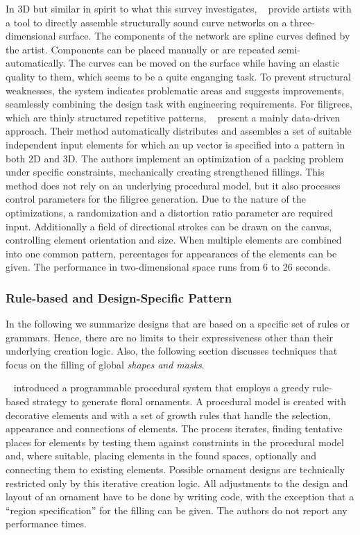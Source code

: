 In 3D but similar in spirit to what this survey investigates, \citeauthor*{zehnder_2016_dso}~\cite{zehnder_2016_dso} provide artists with a tool to directly assemble structurally sound curve networks on a three-dimensional surface. The components of the network are spline curves defined by the artist. Components can be placed manually or are repeated semi-automatically. The curves can be moved on the surface while having an elastic quality to them, which seems to be a quite enganging task. To prevent structural weaknesses, the system indicates problematic areas and suggests improvements, seamlessly combining the design task with engineering requirements. For filigrees, which are thinly structured repetitive patterns, \citeauthor*{chen_2016_sof}~\cite{chen_2016_sof} present a mainly data-driven approach. Their method automatically distributes and assembles a set of suitable independent input elements for which an up vector is specified into a pattern in both 2D and 3D. The authors implement an optimization of a packing problem under specific constraints, mechanically creating strengthened fillings. This method does not rely on an underlying procedural model, but it also processes control parameters for the filigree generation. Due to the nature of the optimizations, a randomization and a distortion ratio parameter are required input. Additionally a field of directional strokes can be drawn on the canvas, controlling element orientation and size. When multiple elements are combined into one common pattern, percentages for appearances of the elements can be given. The performance in two-dimensional space runs from 6 to 26 seconds.


\subsubsection{Rule-based and Design-Specific Pattern}
\label{subsubsec:analysis_rulebased_and_designspecific}

In the following we summarize designs that are based on a specific set of rules or grammars. Hence, there are no limits to their expressiveness other than their underlying creation logic. Also, the following section discusses techniques that focus on the filling of global \textit{shapes and masks}.


\citeauthor*{wong_1998_cgf}~\cite{wong_1998_cgf} introduced a programmable procedural system that employs a greedy rule-based strategy to generate floral ornaments. A procedural model is created with decorative elements and with a set of growth rules that handle the selection, appearance and connections of elements. The process iterates, finding tentative places for elements by testing them against constraints in the procedural model and, where suitable, placing elements in the found spaces, optionally and connecting them to existing elements. Possible ornament designs are technically restricted only by this iterative creation logic. All adjustments to the design and layout of an ornament have to be done by writing code, with the exception that a ``region specification'' for the filling can be given. The authors do not report any performance times.

